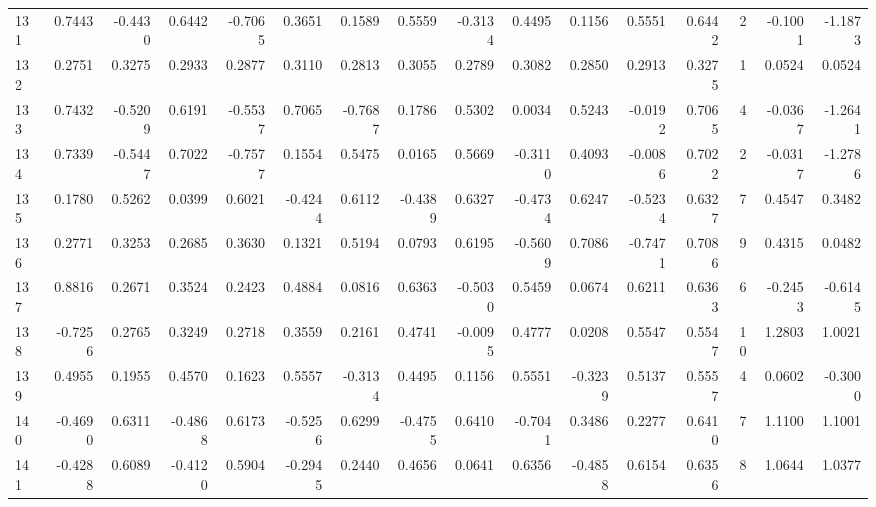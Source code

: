 \begin{tabular}{lrrrrrrrrrrrrrrr}
131 &      0.7443 & -0.4430 &  0.6442 & -0.7065 &  0.3651 &  0.1589 &  0.5559 & -0.3134 &  0.4495 &  0.1156 &   0.5551 &     0.6442 &      2 &                   -0.1001 &                    -1.1873 \\
132 &      0.2751 &  0.3275 &  0.2933 &  0.2877 &  0.3110 &  0.2813 &  0.3055 &  0.2789 &  0.3082 &  0.2850 &   0.2913 &     0.3275 &      1 &                    0.0524 &                     0.0524 \\
133 &      0.7432 & -0.5209 &  0.6191 & -0.5537 &  0.7065 & -0.7687 &  0.1786 &  0.5302 &  0.0034 &  0.5243 &  -0.0192 &     0.7065 &      4 &                   -0.0367 &                    -1.2641 \\
134 &      0.7339 & -0.5447 &  0.7022 & -0.7577 &  0.1554 &  0.5475 &  0.0165 &  0.5669 & -0.3110 &  0.4093 &  -0.0086 &     0.7022 &      2 &                   -0.0317 &                    -1.2786 \\
135 &      0.1780 &  0.5262 &  0.0399 &  0.6021 & -0.4244 &  0.6112 & -0.4389 &  0.6327 & -0.4734 &  0.6247 &  -0.5234 &     0.6327 &      7 &                    0.4547 &                     0.3482 \\
136 &      0.2771 &  0.3253 &  0.2685 &  0.3630 &  0.1321 &  0.5194 &  0.0793 &  0.6195 & -0.5609 &  0.7086 &  -0.7471 &     0.7086 &      9 &                    0.4315 &                     0.0482 \\
137 &      0.8816 &  0.2671 &  0.3524 &  0.2423 &  0.4884 &  0.0816 &  0.6363 & -0.5030 &  0.5459 &  0.0674 &   0.6211 &     0.6363 &      6 &                   -0.2453 &                    -0.6145 \\
138 &     -0.7256 &  0.2765 &  0.3249 &  0.2718 &  0.3559 &  0.2161 &  0.4741 & -0.0095 &  0.4777 &  0.0208 &   0.5547 &     0.5547 &     10 &                    1.2803 &                     1.0021 \\
139 &      0.4955 &  0.1955 &  0.4570 &  0.1623 &  0.5557 & -0.3134 &  0.4495 &  0.1156 &  0.5551 & -0.3239 &   0.5137 &     0.5557 &      4 &                    0.0602 &                    -0.3000 \\
140 &     -0.4690 &  0.6311 & -0.4868 &  0.6173 & -0.5256 &  0.6299 & -0.4755 &  0.6410 & -0.7041 &  0.3486 &   0.2277 &     0.6410 &      7 &                    1.1100 &                     1.1001 \\
141 &     -0.4288 &  0.6089 & -0.4120 &  0.5904 & -0.2945 &  0.2440 &  0.4656 &  0.0641 &  0.6356 & -0.4858 &   0.6154 &     0.6356 &      8 &                    1.0644 &                     1.0377 \\

\end{tabular}
